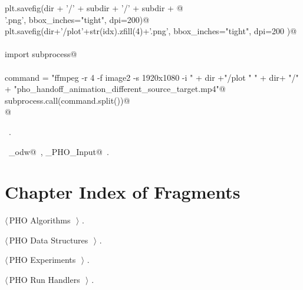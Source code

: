 \documentclass[10.0pt]{report}
\begin{document}
\begin{flushleft}
\begin{minipage}{\linewidth}
\begin{list}{}{}
\mbox{}\verb@         plt.savefig(dir + '/' + subdir + '/' + subdir + @\\
\mbox{}\verb@                     '.png', bbox_inches="tight", dpi=200)@\\
\mbox{}\verb@         plt.savefig(dir+'/plot'+str(idx).zfill(4)+'.png', bbox_inches="tight", dpi=200 )@\\
\mbox{}\verb@@\\
\mbox{}\verb@    import subprocess@\\
\mbox{}\verb@@\\
\mbox{}\verb@    command =  "ffmpeg -r 4 -f image2 -s 1920x1080 -i " + dir +"/plot%04d.png -vcodec libx264 -crf 25  -pix_fmt yuv420p " +\@\\
\mbox{}\verb@               " " + dir+ "/" + "pho_handoff_animation_different_source_target.mp4"@\\
\mbox{}\verb@    subprocess.call(command.split())@\\
\mbox{}\verb@          @\\
\mbox{}\verb@@{\NWsep}
\end{list}
\vspace{-1.5ex}
\footnotesize
\begin{list}{}{\setlength{\itemsep}{-\parsep}\setlength{\itemindent}{-\leftmargin}}
\item \NWtxtMacroRefIn\ .
\item \NWtxtIdentsUsed\nobreak\  \verb@algo_odw@\nobreak\ , \verb@Single_PHO_Input@\nobreak\ .
\item{}
\end{list}
\end{minipage}\vspace{4ex}
\end{flushleft}



\section{Chapter Index of Fragments}

{\small\begin{list}{}{\setlength{\itemsep}{-\parsep}\setlength{\itemindent}{-\leftmargin}}
\item $\langle\,$PHO Algorithms\nobreak\ {\footnotesize {}}$\,\rangle$ {\footnotesize {\NWtxtRefIn} .}
\item $\langle\,$PHO Data Structures\nobreak\ {\footnotesize {}}$\,\rangle$ {\footnotesize {\NWtxtRefIn} .}
\item $\langle\,$PHO Experiments\nobreak\ {\footnotesize {}}$\,\rangle$ {\footnotesize {\NWtxtRefIn} .}
\item $\langle\,$PHO Run Handlers\nobreak\ {\footnotesize {}}$\,\rangle$ {\footnotesize {\NWtxtRefIn} .}
\end{list}}
\end{document}

